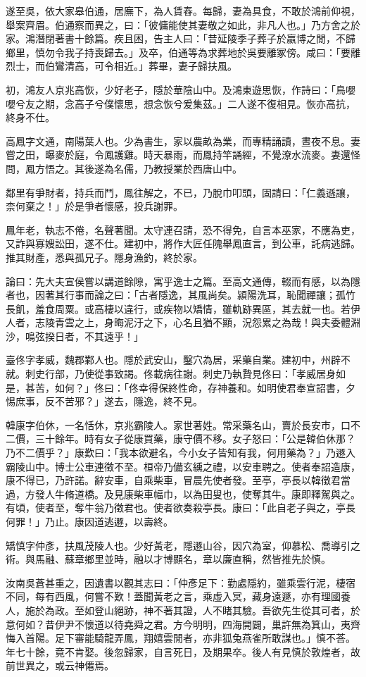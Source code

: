 \begin{pinyinscope}
遂至吳，依大家皋伯通，居廡下，為人賃舂。每歸，妻為具食，不敢於鴻前仰視，舉案齊眉。伯通察而異之，曰：「彼傭能使其妻敬之如此，非凡人也。」乃方舍之於家。鴻潛閉著書十餘篇。疾且困，告主人曰：「昔延陵季子葬子於嬴博之閒，不歸鄉里，慎勿令我子持喪歸去。」及卒，伯通等為求葬地於吳要離冢傍。咸曰：「要離烈士，而伯鸞清高，可令相近。」葬畢，妻子歸扶風。

初，鴻友人京兆高恢，少好老子，隱於華陰山中。及鴻東遊思恢，作詩曰：「鳥嚶嚶兮友之期，念高子兮僕懷思，想念恢兮爰集茲。」二人遂不復相見。恢亦高抗，終身不仕。

高鳳字文通，南陽葉人也。少為書生，家以農畝為業，而專精誦讀，晝夜不息。妻嘗之田，曝麥於庭，令鳳護雞。時天暴雨，而鳳持竿誦經，不覺潦水流麥。妻還怪問，鳳方悟之。其後遂為名儒，乃教授業於西唐山中。

鄰里有爭財者，持兵而鬥，鳳往解之，不已，乃脫巾叩頭，固請曰：「仁義遜讓，柰何棄之！」於是爭者懷感，投兵謝罪。

鳳年老，執志不倦，名聲著聞。太守連召請，恐不得免，自言本巫家，不應為吏，又詐與寡嫂訟田，遂不仕。建初中，將作大匠任隗舉鳳直言，到公車，託病逃歸。推其財產，悉與孤兄子。隱身漁釣，終於家。

論曰：先大夫宣侯嘗以講道餘隙，寓乎逸士之篇。至高文通傳，輟而有感，以為隱者也，因著其行事而論之曰：「古者隱逸，其風尚矣。潁陽洗耳，恥聞禪讓；孤竹長飢，羞食周粟。或高棲以違行，或疾物以矯情，雖軌跡異區，其去就一也。若伊人者，志陵青雲之上，身晦泥汙之下，心名且猶不顯，況怨累之為哉！與夫委體淵沙，鳴弦揆日者，不其遠乎！」

臺佟字孝威，魏郡鄴人也。隱於武安山，鑿穴為居，采藥自業。建初中，州辟不就。刺史行部，乃使從事致謁。佟載病往謝。刺史乃執贄見佟曰：「孝威居身如是，甚苦，如何？」佟曰：「佟幸得保終性命，存神養和。如明使君奉宣詔書，夕惕庶事，反不苦邪？」遂去，隱逸，終不見。

韓康字伯休，一名恬休，京兆霸陵人。家世著姓。常采藥名山，賣於長安市，口不二價，三十餘年。時有女子從康買藥，康守價不移。女子怒曰：「公是韓伯休那？乃不二價乎？」康歎曰：「我本欲避名，今小女子皆知有我，何用藥為？」乃遯入霸陵山中。博士公車連徵不至。桓帝乃備玄纁之禮，以安車聘之。使者奉詔造康，康不得已，乃許諾。辭安車，自乘柴車，冒晨先使者發。至亭，亭長以韓徵君當過，方發人牛脩道橋。及見康柴車幅巾，以為田叟也，使奪其牛。康即釋駕與之。有頃，使者至，奪牛翁乃徵君也。使者欲奏殺亭長。康曰：「此自老子與之，亭長何罪！」乃止。康因道逃遯，以壽終。

矯慎字仲彥，扶風茂陵人也。少好黃老，隱遯山谷，因穴為室，仰慕松、喬導引之術。與馬融、蘇章鄉里並時，融以才博顯名，章以廉直稱，然皆推先於慎。

汝南吳蒼甚重之，因遺書以觀其志曰：「仲彥足下：勤處隱約，雖乘雲行泥，棲宿不同，每有西風，何嘗不歎！蓋聞黃老之言，乘虛入冥，藏身遠遯，亦有理國養人，施於為政。至如登山絕跡，神不著其證，人不睹其驗。吾欲先生從其可者，於意何如？昔伊尹不懷道以待堯舜之君。方今明明，四海開闢，巢許無為箕山，夷齊悔入首陽。足下審能騎龍弄鳳，翔嬉雲閒者，亦非狐兔燕雀所敢謀也。」慎不荅。年七十餘，竟不肯娶。後忽歸家，自言死日，及期果卒。後人有見慎於敦煌者，故前世異之，或云神僊焉。


\end{pinyinscope}
